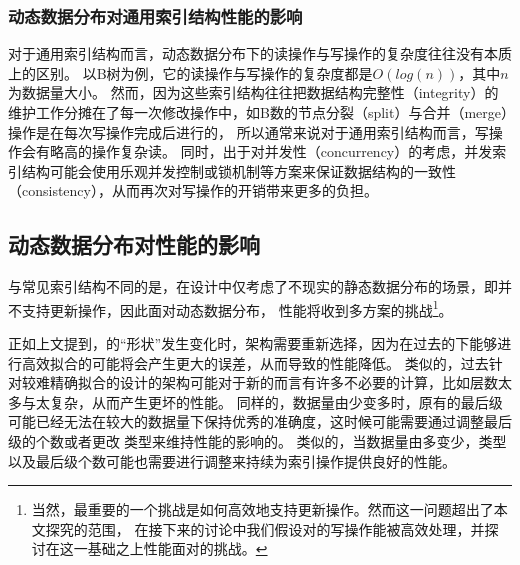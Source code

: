 

\subsubsection{动态数据分布对通用索引结构性能的影响}

对于通用索引结构而言，动态数据分布下的读操作与写操作的复杂度往往没有本质上的区别。
以B树为例，它的读操作与写操作的复杂度都是$O(log(n))$，其中$n$为数据量大小。
然而，因为这些索引结构往往把数据结构完整性（integrity）的维护工作分摊在了每一次修改操作中，如B数的节点分裂（split）与合并（merge）操作是在每次写操作完成后进行的，
所以通常来说对于通用索引结构而言，写操作会有略高的操作复杂读。
同时，出于对并发性（concurrency）的考虑，并发索引结构可能会使用乐观并发控制或锁机制等方案来保证数据结构的一致性（consistency），从而再次对写操作的开销带来更多的负担。

\subsection{动态数据分布对{\li}性能的影响}
\label{sec:dist-affect-li}

与常见索引结构不同的是，{\li}在设计中仅考虑了不现实的静态数据分布的场景，即{\li}并不支持更新操作，因此面对动态数据分布，
{\li}性能将收到多方案的挑战\footnote{当然，最重要的一个挑战是如何高效地支持更新操作。然而这一问题超出了本文探究的范围，
在接下来的讨论中我们假设对{\li}的写操作能被高效处理，并探讨在这一基础之上{\li}性能面对的挑战。}。

正如上文提到，{\cdf}的``形状''发生变化时，{\rmi}架构需要重新选择，因为在过去的{\cdf}下能够进行高效拟合的{\model}可能将会产生更大的误差，从而导致{\li}的性能降低。
类似的，过去针对较难精确拟合的{\cdf}设计的{\rmi}架构可能对于新的{\cdf}而言有许多不必要的计算，比如{\rmi}层数太多与{\model}太复杂，从而产生更坏的{\li}性能。
同样的，数据量由少变多时，原有的{\rmi}最后级{\model}可能已经无法在较大的数据量下保持优秀的准确度，这时候可能需要通过调整{\rmi}最后级{\model}的个数或者更改{\model}类型来维持{\li}性能的影响的。
类似的，当数据量由多变少，{\model}类型以及{\rmi}最后级{\model}个数可能也需要进行调整来持续为索引操作提供良好的性能。

